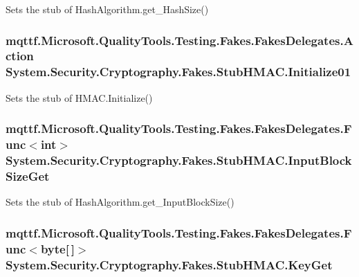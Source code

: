 Sets the stub of Hash\-Algorithm.\-get\-\_\-\-Hash\-Size()

\hypertarget{class_system_1_1_security_1_1_cryptography_1_1_fakes_1_1_stub_h_m_a_c_ae67fb711fc58daf46e269e34e23ea07c}{
\subsubsection[{Initialize01}]{\setlength{\rightskip}{0pt plus 5cm}mqttf.\-Microsoft.\-Quality\-Tools.\-Testing.\-Fakes.\-Fakes\-Delegates.\-Action System.\-Security.\-Cryptography.\-Fakes.\-Stub\-H\-M\-A\-C.\-Initialize01}}\label{class_system_1_1_security_1_1_cryptography_1_1_fakes_1_1_stub_h_m_a_c_ae67fb711fc58daf46e269e34e23ea07c}


Sets the stub of H\-M\-A\-C.\-Initialize()

\hypertarget{class_system_1_1_security_1_1_cryptography_1_1_fakes_1_1_stub_h_m_a_c_a2f6ca2402d32f20f0373b206f5b8c3f5}{
\subsubsection[{Input\-Block\-Size\-Get}]{\setlength{\rightskip}{0pt plus 5cm}mqttf.\-Microsoft.\-Quality\-Tools.\-Testing.\-Fakes.\-Fakes\-Delegates.\-Func$<$int$>$ System.\-Security.\-Cryptography.\-Fakes.\-Stub\-H\-M\-A\-C.\-Input\-Block\-Size\-Get}}\label{class_system_1_1_security_1_1_cryptography_1_1_fakes_1_1_stub_h_m_a_c_a2f6ca2402d32f20f0373b206f5b8c3f5}


Sets the stub of Hash\-Algorithm.\-get\-\_\-\-Input\-Block\-Size()

\hypertarget{class_system_1_1_security_1_1_cryptography_1_1_fakes_1_1_stub_h_m_a_c_af9403f9a6f43156ebd9c419d339e0f26}{
\subsubsection[{Key\-Get}]{\setlength{\rightskip}{0pt plus 5cm}mqttf.\-Microsoft.\-Quality\-Tools.\-Testing.\-Fakes.\-Fakes\-Delegates.\-Func$<$byte\mbox{[}$\,$\mbox{]}$>$ System.\-Security.\-Cryptography.\-Fakes.\-Stub\-H\-M\-A\-C.\-Key\-Get}}\label{class_system_1_1_security_1_1_cryptography_1_1_fakes_1_1_stub_h_m_a_c_af9403f9a6f43156ebd9c419d339e0f26}


